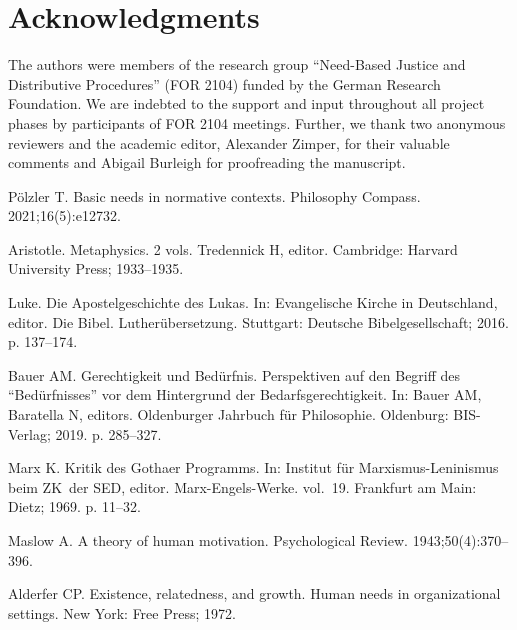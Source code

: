 \documentclass[10pt,letterpaper]{article}
\begin{document}
\clearpage
\section*{Acknowledgments}
The authors were members of the research group ``Need-Based Justice and Distributive Procedures'' (FOR 2104) funded by the German Research Foundation.
We are indebted to the support and input throughout all project phases by participants of FOR 2104 meetings.
Further, we thank two anonymous reviewers and the academic editor, Alexander Zimper, for their valuable comments and Abigail Burleigh for proofreading the manuscript.


\nolinenumbers
\clearpage
\begin{thebibliography}{100}

Pölzler T.
\newblock Basic needs in normative contexts.
\newblock Philosophy Compass. 2021;16(5):e12732.

Aristotle.
\newblock Metaphysics. 2 vols.
\newblock Tredennick H, editor. Cambridge: Harvard University Press;
  1933--1935.

Luke.
\newblock Die {Apostelgeschichte} des {Lukas}.
\newblock In: {Evangelische Kirche in Deutschland}, editor. Die {Bibel}.
  {Lutherübersetzung}. Stuttgart: Deutsche Bibelgesellschaft; 2016. p.
  137--174.

Bauer AM.
\newblock Gerechtigkeit und {Bedürfnis}. {Perspektiven} auf den {Begriff} des
  ``{Bedürfnisses}'' vor dem {Hintergrund} der {Bedarfsgerechtigkeit}.
\newblock In: Bauer AM, Baratella N, editors. Oldenburger {Jahrbuch} für
  {Philosophie}. Oldenburg: BIS-Verlag; 2019. p. 285--327.

Marx K.
\newblock Kritik des {Gothaer} {Programms}.
\newblock In: Institut für Marxismus-Leninismus beim ZK~der SED, editor.
  Marx-{Engels}-{Werke}. vol.~19. Frankfurt am Main: Dietz; 1969. p. 11--32.

Maslow A.
\newblock A theory of human motivation.
\newblock Psychological Review. 1943;50(4):370--396.

Alderfer CP.
\newblock Existence, relatedness, and growth. {Human} needs in organizational
  settings.
\newblock New York: Free Press; 1972.


\end{thebibliography}
\end{document}
